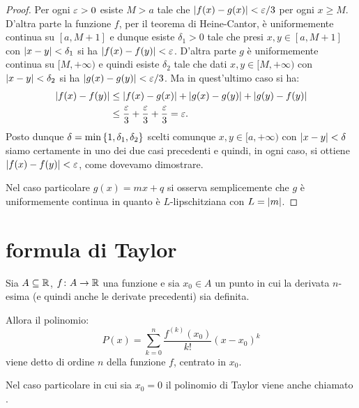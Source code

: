 \begin{proof}
Per ogni $\varepsilon>0$ esiste $M>a$ tale che ${\left|f(x)-g(x)\right|} < \varepsilon/3$ per ogni $x\ge M$. D'altra parte la funzione $f$, per il teorema di Heine-Cantor, è uniformemente continua su $[a,M+1]$ e dunque esiste $\delta_1>0$ tale che presi $x,y \in [a,M+1]$ con ${\left|x-y\right|}< \delta_1$
si ha ${\left|f(x)-f(y)\right|} < \varepsilon$. D'altra parte $g$ è uniformemente continua su $[M,+\infty)$ e quindi esiste $\delta_2$ tale che dati $x,y\in [M,+\infty)$ con ${\left|x-y\right|} < \delta_2$ si ha ${\left|g(x)-g(y)\right|} < \varepsilon/3$. Ma in quest'ultimo caso si ha:
\begin{align*}
  {\left|f(x)-f(y)\right|} &\le {\left|f(x) - g(x)\right|} + {\left|g(x) - g(y)\right|} + {\left|g(y)-f(y)\right|} \\
  & \le \frac{\varepsilon}{3} + \frac{\varepsilon}{3} + \frac{\varepsilon}{3} = \varepsilon.
\end{align*}
Posto dunque $\delta = \min{\left\{ 1, \delta_1, \delta_2 \right\}}$
scelti comunque $x,y\in [a,+\infty)$ con ${\left|x-y\right|}< \delta$ siamo certamente in uno dei due casi precedenti e quindi, in ogni caso, si ottiene ${\left|f(x)-f(y)\right|} < \varepsilon$, come dovevamo dimostrare.

Nel caso particolare $g(x) = mx +q$ si osserva semplicemente che $g$ è uniformemente continua in quanto è $L$-lipschitziana con $L={\left|m\right|}$.
\end{proof}


\section{formula di Taylor}


\begin{definition}
\mymark{***}
Sia $A\subseteq \mathbb R$, $f\colon A \to \mathbb R$ una funzione
e sia $x_0\in A$ un punto in cui la derivata $n$-esima
(e quindi anche le derivate precedenti) sia definita.

Allora il polinomio:
\[
  P(x) = \sum_{k=0}^n \frac{f^{(k)}(x_0)}{k!}(x-x_0)^k
\]
viene detto 
di ordine $n$
della funzione $f$,
centrato in $x_0$.
\end{definition}

Nel caso particolare in cui sia $x_0=0$ il polinomio di Taylor viene anche chiamato .

